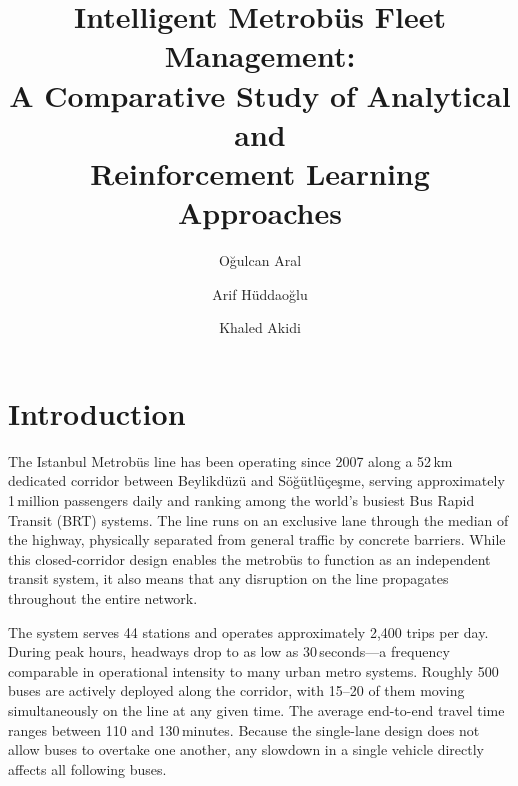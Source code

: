 \documentclass[a4paper,10pt,twocolumn]{article}
\title{\LARGE\textbf{Intelligent Metrob\"{u}s Fleet Management:\\
A Comparative Study of Analytical and\\
Reinforcement Learning Approaches}}
\author[1]{O\u{g}ulcan Aral}
\author[1]{Arif H\"{u}ddao\u{g}lu}
\author[1]{Khaled Akidi}
\affil[1]{Department of Computer Engineering, Istanbul, Turkey}
\date{}
\begin{document}

\section{Introduction}

The Istanbul Metrob\"{u}s line has been operating since 2007 along a 52\,km dedicated corridor between Beylikd\"{u}z\"{u} and S\"{o}\u{g}\"{u}tl\"{u}\c{c}e\c{s}me, serving approximately 1\,million passengers daily and ranking among the world's busiest Bus Rapid Transit (BRT) systems. The line runs on an exclusive lane through the median of the highway, physically separated from general traffic by concrete barriers. While this closed-corridor design enables the metrob\"{u}s to function as an independent transit system, it also means that any disruption on the line propagates throughout the entire network.

The system serves 44 stations and operates approximately 2,400 trips per day. During peak hours, headways drop to as low as 30\,seconds---a frequency comparable in operational intensity to many urban metro systems. Roughly 500 buses are actively deployed along the corridor, with 15--20 of them moving simultaneously on the line at any given time. The average end-to-end travel time ranges between 110 and 130\,minutes. Because the single-lane design does not allow buses to overtake one another, any slowdown in a single vehicle directly affects all following buses.
\end{document}
